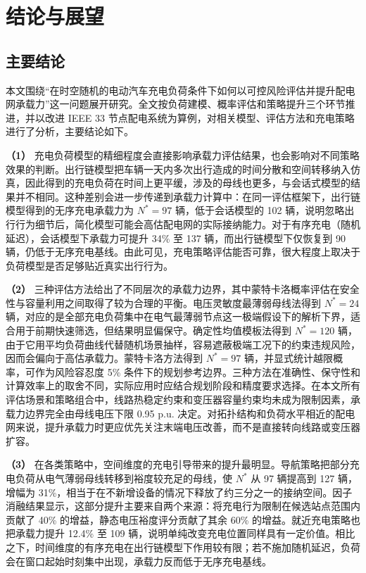 \documentclass[10pt,a4paper]{article}
\numberwithin{equation}{section}
\numberwithin{table}{section}
\numberwithin{figure}{section}
\begin{document}
    \section{结论与展望}

    \subsection{主要结论}

    本文围绕“在时空随机的电动汽车充电负荷条件下如何以可控风险评估并提升配电网承载力”这一问题展开研究。全文按负荷建模、概率评估和策略提升三个环节推进，并以改进 IEEE 33 节点配电系统为算例，对相关模型、评估方法和充电策略进行了分析，主要结论如下。

    \textbf{（1）}
    充电负荷模型的精细程度会直接影响承载力评估结果，也会影响对不同策略效果的判断。出行链模型把车辆一天内多次出行造成的时间分散和空间转移纳入仿真，因此得到的充电负荷在时间上更平缓，涉及的母线也更多，与会话式模型的结果并不相同。这种差别会进一步传递到承载力计算中：在同一评估框架下，出行链模型得到的无序充电承载力为 $N^* = 97$ 辆，低于会话模型的 102 辆，说明忽略出行行为细节后，简化模型可能会高估配电网的实际接纳能力。对于有序充电（随机延迟），会话模型下承载力可提升 34\% 至 137 辆，而出行链模型下仅恢复到 90 辆，仍低于无序充电基线。由此可见，充电策略评估能否可靠，很大程度上取决于负荷模型是否足够贴近真实出行行为。

    \textbf{（2）}
    三种评估方法给出了不同层次的承载力边界，其中蒙特卡洛概率评估在安全性与容量利用之间取得了较为合理的平衡。电压灵敏度最薄弱母线法得到 $N^* = 24$ 辆，对应的是全部充电负荷集中在电气最薄弱节点这一极端假设下的解析下界，适合用于前期快速筛选，但结果明显偏保守。确定性均值模板法得到 $N^* = 120$ 辆，由于它用平均负荷曲线代替随机场景抽样，容易遮蔽极端工况下的约束违规风险，因而会偏向于高估承载力。蒙特卡洛方法得到 $N^* = 97$ 辆，并显式统计越限概率，可作为风险容忍度 5\% 条件下的规划参考边界。三种方法在准确性、保守性和计算效率上的取舍不同，实际应用时应结合规划阶段和精度要求选择。在本文所有评估场景和策略组合中，线路热稳定约束和变压器容量约束均未成为限制因素，承载力边界完全由母线电压下限 0.95 p.u. 决定。对拓扑结构和负荷水平相近的配电网来说，提升承载力时更应优先关注末端电压改善，而不是直接转向线路或变压器扩容。

    \textbf{（3）}
    在各类策略中，空间维度的充电引导带来的提升最明显。导航策略把部分充电负荷从电气薄弱母线转移到裕度较充足的母线，使 $N^*$ 从 97 辆提高到 127 辆，增幅为 31\%，相当于在不新增设备的情况下释放了约三分之一的接纳空间。因子消融结果显示，这部分提升主要来自两个来源：将充电行为限制在候选站点范围内贡献了 40\% 的增益，静态电压裕度评分贡献了其余 60\% 的增益。就近充电策略也把承载力提升 12.4\% 至 109 辆，说明单纯改变充电位置同样具有一定价值。相比之下，时间维度的有序充电在出行链模型下作用较有限；若不施加随机延迟，负荷会在窗口起始时刻集中出现，承载力反而低于无序充电基线。
\end{document}
